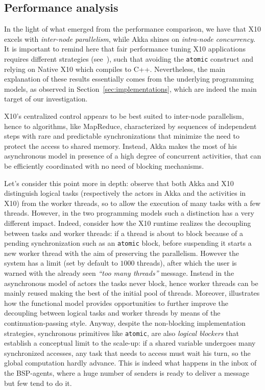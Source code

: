 \documentclass[a4paper]{article}
\numberwithin{equation}{section}
\begin{document}
\subsection{Performance analysis}

In the light of what emerged from the performance comparison,
we have that X10 excels with \emph{inter-node parallelism},
while Akka shines on \emph{intra-node concurrency}. It is important to
remind here that fair performance tuning X10 applications requires
different strategies (see~\cite{X10PerformanceTuning}), such that
avoiding the \verb+atomic+ construct and relying on Native X10 which
compiles to C++. 
Nevertheless, the main explanation of these results essentially
comes from the underlying programming models, as observed in
Section~\ref{sec:implementations}, which are indeed the main target of
our investigation.  

X10's centralized control appears to be best suited to inter-node
parallelism, hence to algorithms, like MapReduce, characterized by
sequences of independent steps with rare and predictable
synchronizations that minimize the need to protect the access to
shared memory. 
Instead, Akka makes the most of his asynchronous model in presence of
a high degree of concurrent activities, that can be efficiently
coordinated with no need of blocking mechanisms.

Let's consider this point more in depth: observe that both Akka and
X10 distinguish logical tasks (respectively the actors in Akka and the
activities in X10) from the worker threads, so to allow the execution
of many tasks with a few threads. 
However, in the two programming models such a distinction has a very
different impact. 
Indeed, consider how the X10 runtime realizes the decoupling between
tasks and worker threads: if a thread is about to block because of a
pending synchronization such as an \verb+atomic+ block, 
before suspending it starts a new worker thread with the aim of
preserving the parallelism. However the system has a limit (set by
default to $1000$ threads), after which the user is warned with the
already seen \emph{``too many threads''} message. 
Instead in the asynchronous model of actors the
tasks never block, hence worker threads can be mainly reused making
the best of the initial pool of threads. 
Moreover, \cite{OderskyHaller09}
illustrates how the functional model provides 
opportunities  to further
improve the decoupling between logical tasks and worker threads
by means of the continuation-passing style.
Anyway, despite the non-blocking implementation strategies, 
synchronous primitives like \verb+atomic+, 
are also \emph{logical blockers} that establish a conceptual
limit to the scale-up:
if a shared variable undergoes many synchronized accesses,
any task that needs to access must wait his turn, so the global
computation hardly advance. 
This is indeed what happens in the inbox of the BSP-agents, 
where a huge number of senders is ready
to deliver a message but few tend to do it.
 
\end{document}
